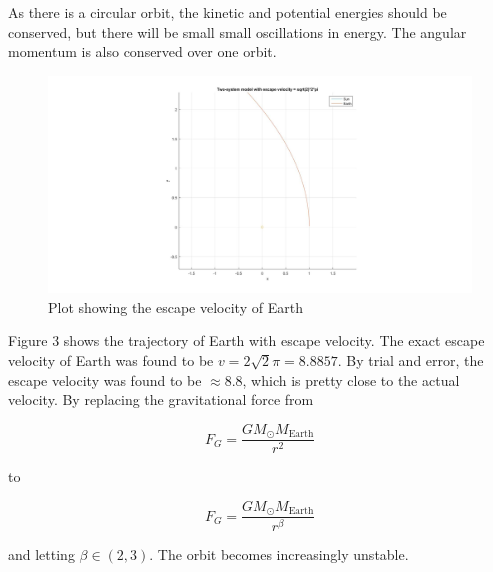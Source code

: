 \documentclass[10pt,a4paper]{article}
\begin{document}
\noindent As there is a circular orbit, the kinetic and potential energies should be conserved, but there will be small small oscillations in energy. The angular momentum is also conserved over one orbit.\\
\begin{figure} [H]
\centerline{\includegraphics[scale=0.2]{escapevelocity.jpg}}
\caption{Plot showing the escape velocity of Earth}
\end{figure}


\noindent Figure 3 shows the trajectory of Earth with escape velocity. The exact escape velocity of Earth was found to be $v=2\sqrt{2}\pi=8.8857$. By trial and error, the escape velocity was found to be $\approx 8.8$, which is pretty close to the actual velocity. By replacing the gravitational force from

$$
F_G=\frac{GM_{\odot}M_{\mathrm{Earth}}}{r^2}
$$

to

$$
F_G=\frac{GM_{\odot}M_{\mathrm{Earth}}}{r^{\beta}}
$$

\noindent and letting $\beta\in(2,3)$. The orbit becomes increasingly unstable. \\
\end{document}
